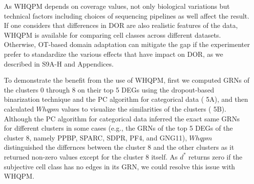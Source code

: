 \documentclass{article}
\begin{document}
As WHQPM depends on coverage values, not only biological variations but technical factors including choices 
of sequencing pipelines as well affect the result. If one considers that differences in DOR are also realistic features 
of the data, WHQPM is available for comparing cell classes across different datasets. Otherwise, \ac{OT}-based 
domain adaptation can mitigate the gap if the experimenter prefer to standardize the various effects 
that have impact on DOR, as we described in \figurename{ S9A-H} and Appendices.

To demonstrate the benefit from the use of WHQPM, first we computed GRNs of the clusters 0 through 8 on 
their top 5 DEGs using the dropout-based binarization technique and the PC algorithm for categorical data (\figurename{ 5A}), 
and then calculated $Whqpm$ values to visualize the similarities of the clusters (\figurename{ 5B}). Although the PC algorithm for categorical data inferred the exact same GRNs for different clusters in some cases (e.g., the GRNs of 
the top 5 DEGs of the cluster 8, namely PPBP, SPARC, SDPR, PF4, and GNG11), $Whqpm$ distinguished the 
differnces between the cluster 8 and the other clusters as it returned non-zero values except for the cluster 8 itself. 
As $d^*$ returns zero if the subjective cell class has no edges in its GRN, we could resolve this issue with WHQPM.
\end{document}
